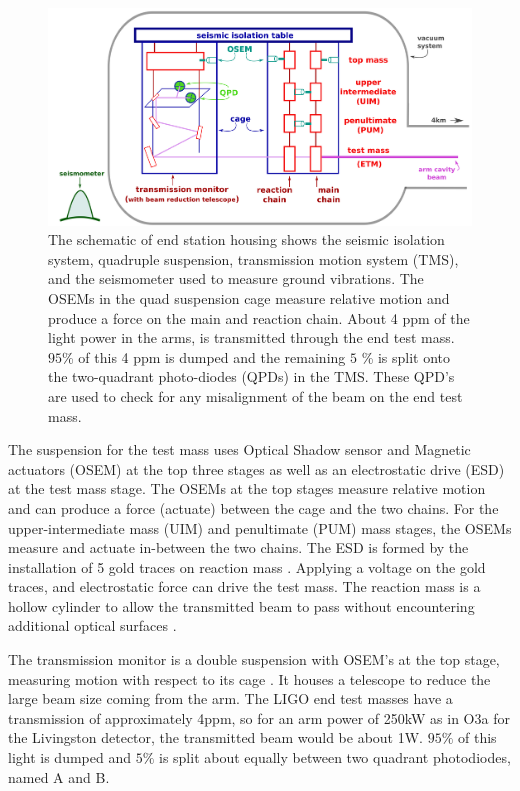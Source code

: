 \documentclass[12pt]{iopart}
\begin{document}
\begin{figure}
    \centering
    \includegraphics[width=\textwidth]{EndStationDiagram3.png}
    \caption{The schematic of end station housing shows the seismic isolation system, quadruple suspension, transmission motion system (TMS), and the seismometer used to measure ground vibrations. The OSEMs in the quad suspension cage measure relative motion and produce a force on the main and reaction chain. About 4 ppm of the light power in the arms, is transmitted through the end test mass. $95$\% of this 4 ppm is dumped and the remaining $5$ \% is split onto the two-quadrant photo-diodes (QPDs) in the TMS. These QPD's are used to check for any misalignment of the beam on the end test mass. }
    \label{fig:end_station}
\end{figure}
The suspension for the test mass uses Optical Shadow sensor and Magnetic actuators (OSEM)  at the top three stages as well as an electrostatic drive (ESD) at the test mass stage. The OSEMs at the top stages measure relative motion and can produce a force (actuate) between the cage and the two chains. For the upper-intermediate mass (UIM) and penultimate (PUM) mass stages, the OSEMs measure and actuate in-between the two chains. The ESD is formed by the installation of 5 gold traces on reaction mass \cite{esd_schematic}. Applying a voltage on the gold traces, and electrostatic force can drive the test mass.  The reaction mass is a hollow cylinder to allow the transmitted beam to pass without encountering additional optical surfaces \cite{aerm_schematic}.

The transmission monitor is a double suspension with OSEM's at the top stage, measuring motion with respect to its cage \cite{Barsotti_2010}. It houses a telescope to reduce the large beam size coming from the arm. The LIGO end test masses have a transmission of approximately 4ppm, so for an arm power of 250kW as in O3a for the Livingston detector, the transmitted beam would be about 1W. $95\%$ of this light is dumped and $5\%$ is split about equally between two quadrant photodiodes, named A and B. 
\end{document}
